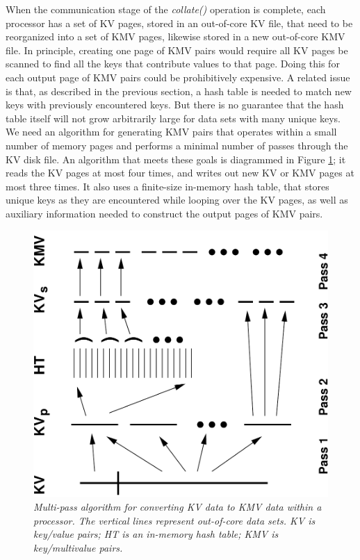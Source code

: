When the communication stage of the {\it collate()} operation is
complete, each processor has a set of KV pages, stored in an
out-of-core KV file, that need to be reorganized into a set of KMV
pages, likewise stored in a new out-of-core KMV file.  In principle,
creating one page of KMV pairs would require all KV pages be scanned
to find all the keys that contribute values to that page.  Doing this
for each output page of KMV pairs could be prohibitively expensive.  A
related issue is that, as described in the previous section, a hash
table is needed to match new keys with previously encountered keys.
But there is no guarantee that the hash table itself will not grow
arbitrarily large for data sets with many unique keys.  We need an
algorithm for generating KMV pairs that operates within a small number
of memory pages and performs a minimal number of passes through the KV
disk file.  An algorithm that meets these goals is diagrammed in
Figure \ref{fig:collate}; it reads the KV pages at most four times,
and writes out new KV or KMV pages at most three times.  It also uses
a finite-size in-memory hash table, that stores unique keys as they
are encountered while looping over the KV pages, as well as auxiliary
information needed to construct the output pages of KMV pairs.

\begin{figure}
\includegraphics[width=\textwidth,angle=-90]{fig_collate2.pdf}
\caption{\it Multi-pass algorithm for converting KV data to KMV data within
a processor.
The vertical lines represent out-of-core data sets.  KV is key/value
pairs; HT is an in-memory hash table; KMV is key/multivalue pairs.}
\label{fig:collate}
\end{figure}

